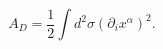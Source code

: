 \begin{equation}
\label{diri}
A_D=\frac{1}{2}\int d^2\sigma (\partial_ix^{\alpha})^2. 
\end{equation}

